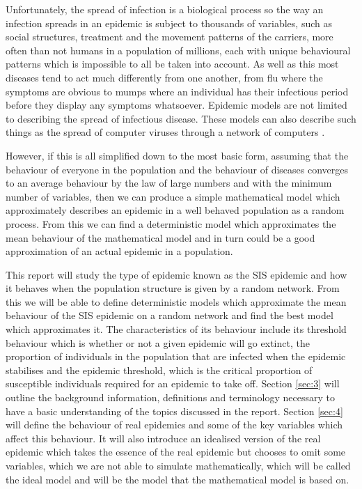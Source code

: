 \documentclass{uonmathsreport}
\begin{document}
Unfortunately, the spread of infection is a biological process so the way an infection spreads in an epidemic is subject to thousands of variables, such as social structures, treatment and the movement patterns of the carriers, more often than not humans in a population of millions, each with unique behavioural patterns which is impossible to all be taken into account. As well as this most diseases tend to act much differently from one another, from flu where the symptoms are obvious to mumps where an individual has their infectious period before they display any symptoms whatsoever. Epidemic models are not limited to describing the spread of infectious disease. These models can also describe such things as the spread of computer viruses through a network of computers \cite{bibkephart}  \cite{bibyang}. 

However, if this is all simplified down to the most basic form, assuming that the behaviour of everyone in the population and the behaviour of diseases converges to an average behaviour by the law of large numbers and with the minimum number of variables, then we can produce a simple mathematical model which approximately describes an epidemic in a well behaved population as a random process. From this we can find a deterministic model which approximates the mean behaviour of the mathematical model and in turn could be a good approximation of an actual epidemic in a population.

This report will study the type of epidemic known as the SIS epidemic and how it behaves when the population structure is given by a random network. From this we will be able to define deterministic models which approximate the mean behaviour of the SIS epidemic on a random network and find the best model which approximates it. The characteristics of its behaviour include its threshold behaviour which is whether or not a given epidemic will go extinct, the proportion of individuals in the population that are infected when the epidemic stabilises and the epidemic threshold, which is the critical proportion of susceptible individuals required for an epidemic to take off. Section \ref{sec:3} will outline the background information, definitions and terminology necessary to have a basic understanding of the topics discussed in the report. Section \ref{sec:4} will define the behaviour of real epidemics and some of the key variables which affect this behaviour. It will also introduce an idealised version of the real epidemic which takes the essence of the real epidemic but chooses to omit some variables, which we are not able to simulate mathematically, which will be called the ideal model and will be the model that the mathematical model is based on.
\end{document}
